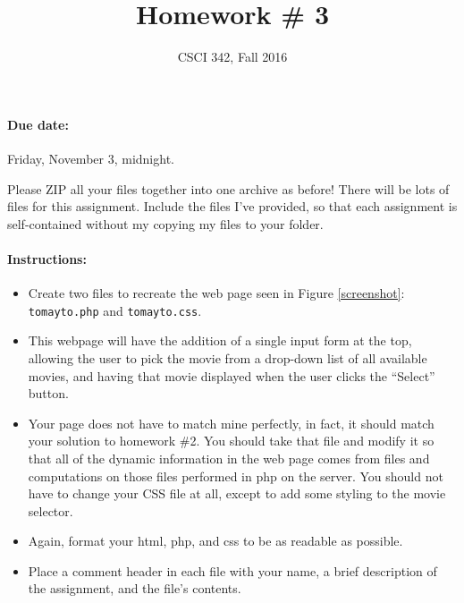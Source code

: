 \documentclass{article}
\author{CSCI 342, Fall 2016}\title{Homework \# 3}
\begin{document}
\maketitle


\paragraph{Due date:}  Friday, November 3, midnight.

Please ZIP all your files together into one archive as before!  There
will be lots of files for this assignment.  Include the files I've
provided, so that each assignment is self-contained without my copying
my files to your folder.


\paragraph{Instructions:}
\begin{itemize}
  \item
Create two files to recreate the web page seen
in Figure \ref{screenshot}:
{\tt tomayto.php} and
{\tt tomayto.css}.
\item
This webpage will have the addition of a single input form at the top,
allowing the user to pick the movie from a drop-down list of all
available movies, and having that movie displayed when the user clicks
the ``Select'' button.
\item
Your page does not have to match mine perfectly, in fact, it should
match your solution to homework \#2.  You should take that file and
modify it so that all of the dynamic information in the web page comes
from files and computations on those files performed in php on the
server.  You should not have to change your CSS file at all, except to
add some styling to the movie selector.
\item
Again, format your html, php, and css to be as readable as
possible. 
\item
Place a comment header in each file with your name, a brief
description of the assignment, and the file's contents.
\end{itemize}
\end{document}
